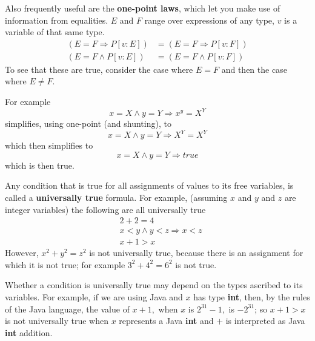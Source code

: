 \documentclass[muchmore,11pt]{article}%
\begin{document}
Also frequently useful are the \textbf{one-point laws}, which let you make use
of information from equalities. $E$ and $F$ range over expressions of any
type, $v$ is a variable of that same type.
\begin{align*}
\left(  E=F\Rightarrow P[v:E]\right)   &  =\left(  E=F\Rightarrow
P[v:F]\right) \\
\left(  E=F\wedge P[v:E]\right)   &  =\left(  E=F\wedge P[v:F]\right)
\end{align*}
To see that these are true, consider the case where $E=F$ and then the case
where $E\neq F$.

For example%
\[
x=X\wedge y=Y\Rightarrow x^{y}=X^{Y}%
\]
simplifies, using one-point (and shunting), to%
\[
x=X\wedge y=Y\Rightarrow X^{Y}=X^{Y}%
\]
which then simplifies to%
\[
x=X\wedge y=Y\Rightarrow\mathit{true}%
\]
which is then true.

Any condition that is true for all assignments of values to its free
variables, is called a \textbf{universally true} formula. For example,
(assuming $x$ and $y$ and $z$ are integer variables) the following are all
universally true%
\begin{align*}
&  \left.  2+2=4\right. \\
&  \left.  x<y\wedge y<z\Rightarrow x<z\right. \\
&  \left.  x+1>x\right.
\end{align*}
However, $x^{2}+y^{2}=z^{2}$ is not universally true, because there is an
assignment for which it is not true; for example $3^{2}+4^{2}=6^{2}$ is not true.

Whether a condition is universally true may depend on the types ascribed to
its variables. For example, if we are using Java and $x$ has type
\textbf{int}, then, by the rules of the Java language, the value of $x+1,$
when $x$ is $2^{31}-1,$ is $-2^{31}$; so $x+1>x$ is not universally true when
$x$ represents a Java \textbf{int} and $+$ is interpreted as Java \textbf{int} addition.

\begin{comment}
    Note that Dafny uses short circuiting three valued logic, so it might be a good idea to change POL to
    do the same.
\end{comment}
\end{document}
